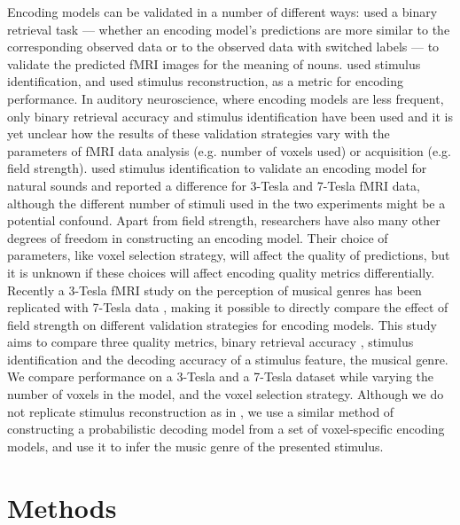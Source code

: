 
Encoding models can be validated in a number of different ways: \citet{ML08}
used a binary retrieval task --- whether an encoding model's predictions
are more similar to the  corresponding observed data or to the observed data
with switched labels --- to validate the predicted f{MRI}
images for the meaning of nouns. \citet{KG+08} used stimulus
identification, and \citet{NG09} used stimulus reconstruction,
as a metric for encoding performance. In auditory neuroscience, where encoding models are less
frequent, only binary retrieval accuracy \citep{CTK+2012} and stimulus
identification \citep{SF14} have been used and it is yet unclear how the
results of these validation strategies vary with the parameters of f{MRI} data
analysis (e.g. number of voxels used)  or acquisition (e.g. field strength).
\citet{SF14} used stimulus identification to validate an encoding model for
natural sounds and reported a difference for 3-Tesla and 7-Tesla f{MRI} data,
although the different number of stimuli used in the two experiments might be a
potential confound.  Apart from field strength, researchers have also many
other degrees of freedom in constructing an encoding model.  Their choice of
parameters, like voxel selection strategy, will affect the quality of
predictions, but it is unknown if these choices will affect encoding quality
metrics differentially.  Recently a 3-Tesla f{MRI} study on the perception of
musical genres \citep{CTK+2012} has been replicated with 7-Tesla data
\citep{HDH+2015}, making it possible to directly compare the effect of field
strength on different validation strategies for encoding models.  This study
aims to compare three quality metrics, binary retrieval accuracy \citep{ML08},
stimulus identification \citep{KG+08,SF14} and the decoding accuracy of a stimulus
feature, the musical genre. We compare
performance on a 3-Tesla and a 7-Tesla dataset while varying the number of
voxels in the model, and the voxel selection strategy.  Although we do
not replicate stimulus reconstruction as in \citep{NG09}, we use a similar
method of constructing a probabilistic decoding model from a set of
voxel-specific encoding models, and use it to infer the music genre of the
presented stimulus.


\section*{Methods}


